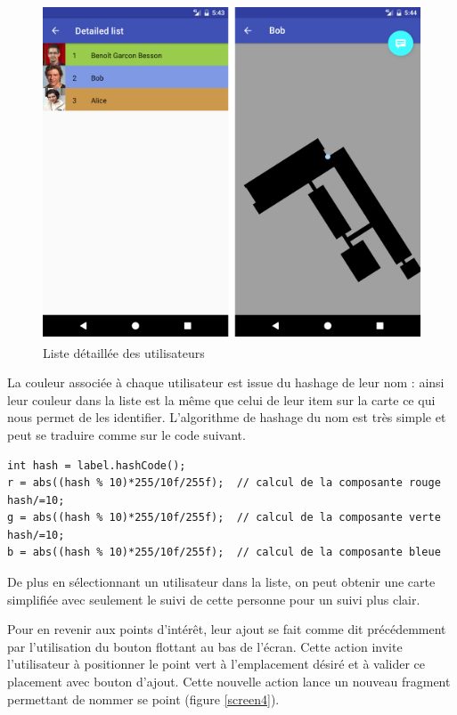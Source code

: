 \begin{figure}[H]
    \centering
    \includegraphics[height=10cm]{./img/screen3.png}
    \caption{Liste détaillée des utilisateurs}
    \label{screen3}
\end{figure}

La couleur associée à chaque utilisateur est issue du hashage de leur nom : ainsi leur couleur dans la liste est la même que celui de leur item sur la carte ce qui nous permet de les identifier. L’algorithme de hashage du nom est très simple et peut se traduire comme sur le code suivant.

\lstset{language=Java}
\begin{lstlisting}[caption=Hashage du nom en couleur]
int hash = label.hashCode();
r = abs((hash % 10)*255/10f/255f);	// calcul de la composante rouge
hash/=10;
g = abs((hash % 10)*255/10f/255f); 	// calcul de la composante verte
hash/=10;
b = abs((hash % 10)*255/10f/255f); 	// calcul de la composante bleue
\end{lstlisting}

De plus en sélectionnant un utilisateur dans la liste, on peut obtenir une carte simplifiée avec seulement le suivi de cette personne pour un suivi plus clair.

Pour en revenir aux points d’intérêt, leur ajout se fait comme dit précédemment par l’utilisation du bouton flottant au bas de l’écran. Cette action invite l’utilisateur à positionner le point vert à l’emplacement désiré et à valider ce placement avec bouton d’ajout. Cette nouvelle action lance un nouveau fragment permettant de nommer se point (figure \ref{screen4}).

